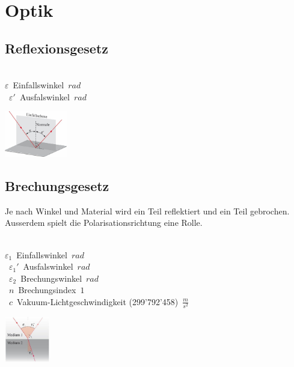 \section{Optik}
\subsection{Reflexionsgesetz}

\begin{center}
	\begin{minipage}{0.3\textwidth}
		 \\
	
		\unit{$\varepsilon$}{Einfallswinkel}{$rad$} \\
		\unit{$\varepsilon'$}{Ausfalswinkel}{$rad$}
	\end{minipage}%
	\begin{minipage}{0.3\textwidth}
		\includegraphics[height=2cm,keepaspectratio=true]{Images/reflexionsgesetz.png}
	\end{minipage}
\end{center}




\subsection{Brechungsgesetz}

Je nach Winkel und Material wird ein Teil reflektiert und ein Teil gebrochen. Ausserdem spielt die Polarisationsrichtung eine Rolle.
\begin{center}
	\begin{minipage}{0.3\textwidth}
		\\
	
		\unit{$\varepsilon_1$}{Einfallswinkel}{$rad$} \\
		\unit{$\varepsilon_1'$}{Ausfalswinkel}{$rad$} \\
		\unit{$\varepsilon_2$}{Brechungswinkel}{$rad$} \\
		\unit{$n$}{Brechungsindex}{$1$} \\
		\unit{$c$}{Vakuum-Lichtgeschwindigkeit (299'792'458)}{$\frac{m}{s^2}$}	
	\end{minipage}%
	\begin{minipage}{0.3\textwidth}
		\includegraphics[height=2cm,keepaspectratio=true]{Images/brechungsgesetz.png}
	\end{minipage}
\end{center}




